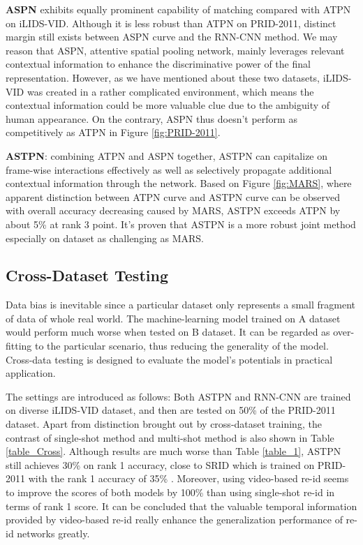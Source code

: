 \documentclass[10pt,twocolumn,letterpaper]{article}
\begin{document}
\textbf{ASPN} exhibits equally prominent capability of matching compared with ATPN on iLIDS-VID. Although it is less robust than ATPN on PRID-2011, distinct margin still exists between ASPN curve and the RNN-CNN method. We may reason that ASPN, attentive spatial pooling network, mainly leverages relevant contextual information to enhance the discriminative power of the final representation. However, as we have mentioned about these two datasets, iLIDS-VID was created in a rather complicated environment, which means the contextual information could be more valuable clue due to the ambiguity of human appearance. On the contrary, ASPN thus doesn't perform as competitively as ATPN in Figure \ref{fig:PRID-2011}.    

\textbf{ASTPN}: combining ATPN and ASPN together, ASTPN can capitalize on frame-wise interactions effectively as well as selectively propagate additional contextual information through the network. Based on Figure \ref{fig:MARS}, where apparent distinction between ATPN curve and ASTPN curve can be observed with overall accuracy decreasing caused by MARS, ASTPN exceeds ATPN by about 5\% at rank 3 point. It's proven that ASTPN is a more robust joint method especially on dataset as challenging as MARS. 
 
\subsection{Cross-Dataset Testing}
Data bias is inevitable since a particular dataset only represents a small fragment of data of whole real world. The machine-learning model trained on A dataset would perform much worse when tested on B dataset. It can be regarded as over-fitting to the particular scenario, thus reducing the generality of the model. Cross-data testing is designed to evaluate the model's potentials in practical application.

The settings are introduced as follows: Both ASTPN and RNN-CNN are trained on diverse iLIDS-VID dataset, and then are tested on 50\% of the PRID-2011 dataset. Apart from distinction brought out by cross-dataset training, the contrast of single-shot method and multi-shot method is also shown in Table \ref{table_Cross}. Although results are much worse than Table \ref{table_1}, ASTPN still achieves 30\% on rank 1 accuracy, close to  SRID \cite{SRID} which is trained on PRID-2011 with the rank 1 accuracy of 35\% . Moreover, using video-based re-id seems to improve the scores of both models by 100\% than using single-shot re-id in terms of rank 1 score. It can be concluded that the valuable temporal information provided by video-based re-id really enhance the generalization performance of re-id networks greatly.    
\end{document}
